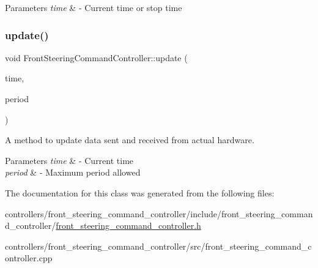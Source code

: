 \begin{DoxyParams}{Parameters}
{\em time} & -\/ Current time or stop time \\
\hline
\end{DoxyParams}
\mbox{\label{classfront__steering__command__controller_1_1FrontSteeringCommandController_aaeb307f29082c65582775309704b1ad8}} 
\subsubsection{\texorpdfstring{update()}{update()}}
{\footnotesize\ttfamily void Front\+Steering\+Command\+Controller\+::update (\begin{DoxyParamCaption}\item[{const ros\+::\+Time \&}]{time,  }\item[{const ros\+::\+Duration \&}]{period }\end{DoxyParamCaption})}



A method to update data sent and received from actual hardware. 


\begin{DoxyParams}{Parameters}
{\em time} & -\/ Current time \\
\hline
{\em period} & -\/ Maximum period allowed \\
\hline
\end{DoxyParams}


The documentation for this class was generated from the following files\+:\begin{DoxyCompactItemize}
\item 
controllers/front\+\_\+steering\+\_\+command\+\_\+controller/include/front\+\_\+steering\+\_\+command\+\_\+controller/\hyperlink{front__steering__command__controller_8h}{front\+\_\+steering\+\_\+command\+\_\+controller.\+h}\item 
controllers/front\+\_\+steering\+\_\+command\+\_\+controller/src/front\+\_\+steering\+\_\+command\+\_\+controller.\+cpp\end{DoxyCompactItemize}
